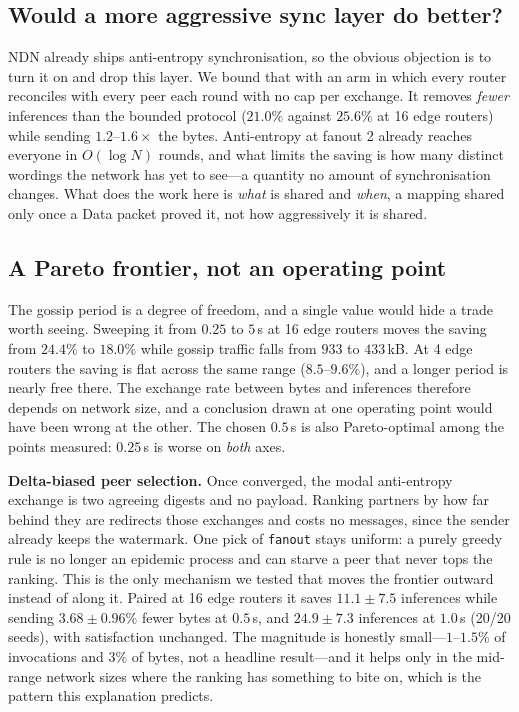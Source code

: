 \documentclass[conference]{IEEEtran}
\begin{document}
		\subsection{Would a more aggressive sync layer do better?}
		
		NDN already ships anti-entropy synchronisation, so the obvious objection is to
		turn it on and drop this layer. We bound that with an arm in which every router
		reconciles with every peer each round with no cap per exchange. It removes
		\emph{fewer} inferences than the bounded protocol ($21.0\%$ against $25.6\%$ at
		16 edge routers) while sending $1.2$--$1.6\times$ the bytes. Anti-entropy at
		fanout 2 already reaches everyone in $O(\log N)$ rounds, and what limits the
		saving is how many distinct wordings the network has yet to see---a quantity no
		amount of synchronisation changes. What does the work here is \emph{what} is
		shared and \emph{when}, a mapping shared only once a Data packet proved it, not
		how aggressively it is shared.
		
		\subsection{A Pareto frontier, not an operating point}
		\label{sec:frontier}
		
		The gossip period is a degree of freedom, and a single value would hide a trade
		worth seeing. Sweeping it from $0.25$ to $5$\,s at 16 edge routers moves the
		saving from $24.4\%$ to $18.0\%$ while gossip traffic falls from $933$ to
		$433$\,kB. At 4 edge routers the saving is flat across the same range
		($8.5$--$9.6\%$), and a longer period is nearly free there. The exchange rate
		between bytes and inferences therefore depends on network size, and a
		conclusion drawn at one operating point would have been wrong at the other.
		The chosen $0.5$\,s is also Pareto-optimal among the points measured: $0.25$\,s
		is worse on \emph{both} axes.
		
		\textbf{Delta-biased peer selection.} Once converged, the modal anti-entropy
		exchange is two agreeing digests and no payload. Ranking partners by how far
		behind they are redirects those exchanges and costs no messages, since the
		sender already keeps the watermark. One pick of \texttt{fanout} stays uniform:
		a purely greedy rule is no longer an epidemic process and can starve a peer
		that never tops the ranking. This is the only mechanism we tested that moves
		the frontier outward instead of along it. Paired at 16 edge routers it saves
		$11.1 \pm 7.5$ inferences while sending $3.68 \pm 0.96\%$ fewer bytes at
		$0.5$\,s, and $24.9 \pm 7.3$ inferences at $1.0$\,s (20/20 seeds), with
		satisfaction unchanged. The magnitude is honestly small---$1$--$1.5\%$ of
		invocations and $3\%$ of bytes, not a headline result---and it helps only in
		the mid-range network sizes where the ranking has something to bite on, which
		is the pattern this explanation predicts.
		
\end{document}
